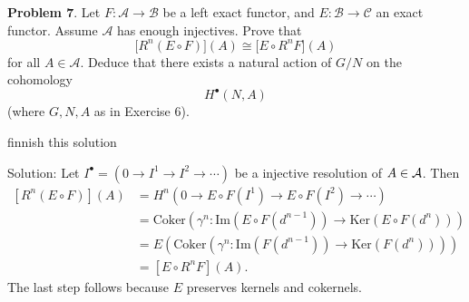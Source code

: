 \begin{dang}
    \textbf{Problem 7}.
Let $F : \mathcal{A} \to \mathcal{B}$ be a left exact functor, and
$E : \mathcal{B} \to \mathcal{C}$ an exact functor. Assume
$\mathcal{A}$ has enough injectives. Prove that
\[
\bigl[R^n(E \circ F)\bigr](A)
\cong
\bigl[E \circ R^nF\bigr](A)
\]
for all $A \in \mathcal{A}$. Deduce that there exists a natural action
of $G/N$ on the cohomology
\[
H^\bullet(N,A)
\]
(where $G,N,A$ as in Exercise 6).
\end{dang}
\TODO finnish this solution\par
Solution: Let $I^\bullet = (0\to I^1\to I^2\to\cdots)$ be a injective resolution of $A\in\mathcal{A}$. Then 
\begin{equation}
    \begin{split}
        [R^n(E\circ F)](A) &= H^n(0\to E\circ F(I^1)\to E\circ F(I^2)\to\cdots)\\
        &=\text{Coker}(\gamma^n:\text{Im}(E\circ F(d^{n-1}))\to \text{Ker}(E\circ F(d^n)))\\
        &=E(\text{Coker}(\gamma^n:\text{Im}(F(d^{n-1}))\to \text{Ker}(F(d^n))))\\
        &=[E\circ R^nF](A).
    \end{split}
\end{equation}
The last step follows because $E$ preserves kernels and cokernels.



